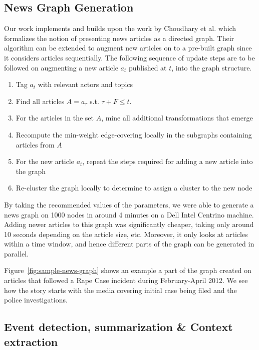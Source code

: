 \subsection{News Graph Generation}\label{sec:graph-desc}
Our work implements and builds upon the work by Choudhary et
al.\cite{choudhary@ecir2008} which formalizes the notion of presenting
news articles as a directed graph.  Their algorithm can be extended to
augment new articles on to a pre-built graph since it considers
articles sequentially.  The following sequence of update steps are to
be followed on augmenting a new article $a_t$ published at $t$, into
the graph structure.
\begin{enumerate}
  \item Tag $a_t$ with relevant actors and topics
  \item Find all articles $A = a_\tau$ s.t. $\tau+F \leq t$.
  \item For the articles in the set $A$, mine all additional transformations that emerge
  \item Recompute the min-weight edge-covering locally in the subgraphs containing articles from $A$
  \item For the new article $a_t$, repeat the steps required for adding a new article into the graph
  \item Re-cluster the graph locally to determine to assign a cluster to the new node
\end{enumerate}
By taking the recommended values of the parameters, we were able to generate a news graph on 1000 nodes in around 4 minutes on a Dell Intel Centrino machine.
Adding newer articles to this graph was significantly cheaper, taking only around 10 seconds depending on the article size, etc.
Moreover, it only looks at articles within a time window, and hence different parts of the graph can be generated in parallel.

Figure~\ref{fig:sample-news-graph}  shows an example a part of the graph created on articles that followed a Rape Case incident during February-April 2012. We see how the
story starts with the media covering initial case being filed and the police investigations.

\subsection{Event detection, summarization \& Context extraction}\label{sec:event-detection-summary-context}
